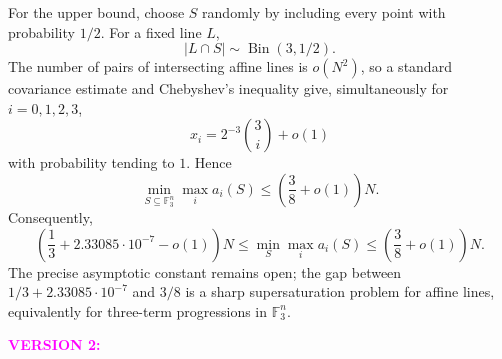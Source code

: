 \documentclass[10pt]{article}
\theoremstyle{definition}
\newcommand{\zs}[1]{\textcolor{magenta}{\textbf{#1}}}
\begin{document}
	For the upper bound, choose \(S\) randomly by including every point with
	probability \(1/2\).  For a fixed line \(L\),
	\[
	|L\cap S|\sim \operatorname{Bin}(3,1/2).
	\]
	The number of pairs of intersecting affine lines is \(o(N^2)\), so a
	standard covariance estimate and Chebyshev's inequality give,
	simultaneously for \(i=0,1,2,3\),
	\[
	x_i
	=
	2^{-3}{3\choose i}+o(1)
	\]
	with probability tending to \(1\).  Hence
	\[
	\min_{S\subseteq\mathbb F_3^n}
	\max_i a_i(S)
	\leq
	\left(\frac38+o(1)\right)N.
	\]
	Consequently,
	\[
	\left(\frac13+2.33085\cdot 10^{-7}-o(1)\right)N
	\leq
	\min_S\max_i a_i(S)
	\leq
	\left(\frac38+o(1)\right)N.
	\]
	The precise asymptotic constant remains open; the gap between
	\(1/3+2.33085\cdot 10^{-7}\) and \(3/8\) is a sharp supersaturation
	problem for affine lines, equivalently for three-term progressions in
	\(\mathbb F_3^n\).
	
	\newpage
	\noindent \zs{VERSION 2:}
	
	\fi
	
\end{document}
